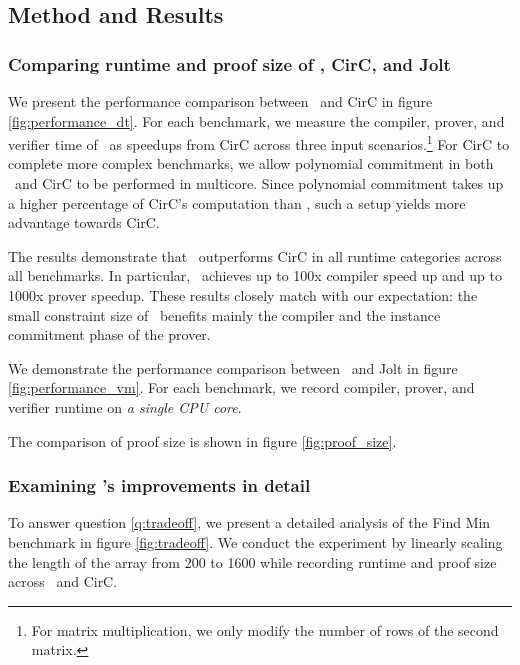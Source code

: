 \subsection{Method and Results}
\subsubsection{Comparing runtime and proof size of \CoBBl, CirC, and Jolt}




We present the performance comparison between \CoBBl~and CirC in figure \ref{fig:performance_dt}.  For each benchmark, we measure the compiler, prover, and verifier time of \CoBBl~as speedups from CirC across three input scenarios.\footnote{For matrix multiplication, we only modify the number of rows of the second matrix.} For CirC to complete more complex benchmarks, we allow polynomial commitment in both \CoBBl~and CirC to be performed in multicore. Since polynomial commitment takes up a higher percentage of CirC's computation than \CoBBl, such a setup yields more advantage towards CirC.

The results demonstrate that \CoBBl~outperforms CirC in all runtime categories across all benchmarks. In particular, \CoBBl~achieves up to 100x compiler speed up and up to 1000x prover speedup. These results closely match with our expectation: the small constraint size of \CoBBl~benefits mainly the compiler and the instance commitment phase of the prover.

We demonstrate the performance comparison between \CoBBl~and Jolt in figure \ref{fig:performance_vm}. For each benchmark, we record compiler, prover, and verifier runtime on \emph{a single CPU core}.


The comparison of proof size is shown in figure \ref{fig:proof_size}.

\subsubsection{Examining \CoBBl's improvements in detail}


To answer question \ref{q:tradeoff}, we present a detailed analysis of the Find Min benchmark in figure \ref{fig:tradeoff}. We conduct the experiment by linearly scaling the length of the array from 200 to 1600 while recording runtime and proof size across \CoBBl~and CirC.

